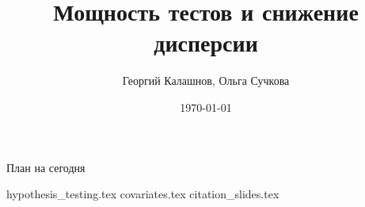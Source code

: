 \title{Мощность тестов и снижение дисперсии}
\author[Георгий Калашнов, Ольга Сучкова]{Георгий Калашнов, Ольга Сучкова}
\date{\today}



\begin{frame}
  \titlepage
  \begin{flushright}
  \end{flushright}
\end{frame}

\begin{frame}{План на сегодня} 
\tableofcontents
\end{frame}

{hypothesis_testing.tex}
{covariates.tex}
{citation_slides.tex}

